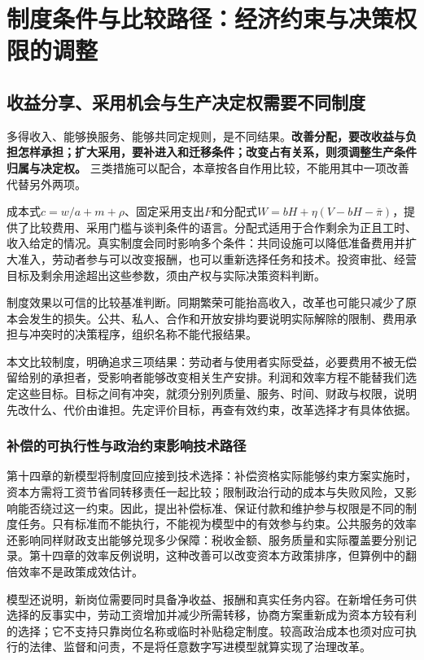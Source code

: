 \documentclass[UTF8,fontset=windows,12pt,a4paper,oneside,openany]{ctexbook}
\begin{document}
\chapter{制度条件与比较路径：经济约束与决策权限的调整}\label{ch:15}

\section{收益分享、采用机会与生产决定权需要不同制度}

多得收入、能够换服务、能够共同定规则，是不同结果。\textbf{改善分配，要改收益与负担怎样承担；扩大采用，要补进入和迁移条件；改变占有关系，则须调整生产条件归属与决定权。} 三类措施可以配合，本章按各自作用比较，不能用其中一项改善代替另外两项。

成本式$c=w/a+m+\rho$、固定采用支出$F$和分配式$W=bH+\eta(V-bH-\bar\pi)$，提供了比较费用、采用门槛与谈判条件的语言。分配式适用于合作剩余为正且工时、收入给定的情况。真实制度会同时影响多个条件：共同设施可以降低准备费用并扩大准入，劳动者参与可以改变报酬，也可以重新选择任务和技术。投资审批、经营目标及剩余用途超出这些参数，须由产权与实际决策资料判断。

制度效果以可信的比较基准判断。同期繁荣可能抬高收入，改革也可能只减少了原本会发生的损失。公共、私人、合作和开放安排均要说明实际解除的限制、费用承担与冲突时的决策程序，组织名称不能代报结果。

本文比较制度，明确追求三项结果：劳动者与使用者实际受益，必要费用不被无偿留给别的承担者，受影响者能够改变相关生产安排。利润和效率方程不能替我们选定这些目标。目标之间有冲突，就须分别列质量、服务、时间、财政与权限，说明先改什么、代价由谁担。先定评价目标，再查有效约束，改革选择才有具体依据。

\subsection{补偿的可执行性与政治约束影响技术路径}

第十四章的新模型将制度回应接到技术选择：补偿资格实际能够约束方案实施时，资本方需将工资节省同转移责任一起比较；限制政治行动的成本与失败风险，又影响能否绕过这一约束。因此，提出补偿标准、保证付款和维护参与权限是不同的制度任务。只有标准而不能执行，不能视为模型中的有效参与约束。公共服务的效率还影响同样财政支出能够兑现多少保障：税收金额、服务质量和实际覆盖要分别记录。第十四章的效率反例说明，这种改善可以改变资本方政策排序，但算例中的翻倍效率不是政策成效估计。

模型还说明，新岗位需要同时具备净收益、报酬和真实任务内容。在新增任务可供选择的反事实中，劳动工资增加并减少所需转移，协商方案重新成为资本方较有利的选择；它不支持只靠岗位名称或临时补贴稳定制度。较高政治成本也须对应可执行的法律、监督和问责，不是将任意数字写进模型就算实现了治理改革。
\end{document}
